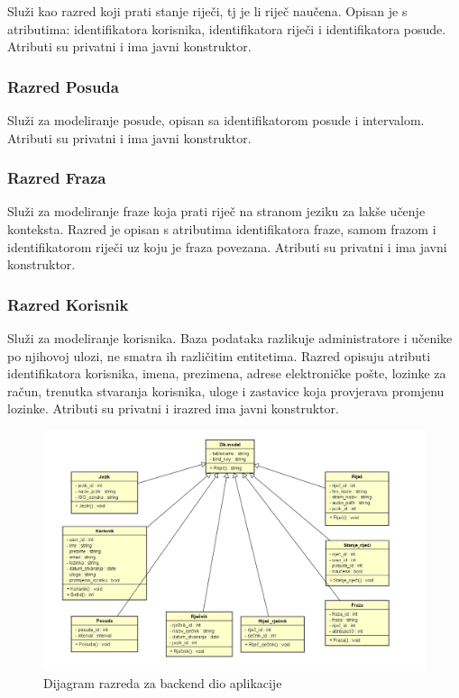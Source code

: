 Služi kao razred koji prati stanje riječi, tj je li riječ naučena. Opisan je s atributima: identifikatora korisnika, identifikatora riječi i identifikatora posude. Atributi su privatni i ima javni konstruktor.

\subsubsection{Razred Posuda}

Služi za modeliranje posude, opisan sa identifikatorom posude i intervalom.
Atributi su privatni i ima javni konstruktor.

\subsubsection{Razred Fraza}

Služi za modeliranje fraze koja prati riječ na stranom jeziku za lakše
učenje konteksta. Razred je opisan s atributima identifikatora fraze, samom frazom i identifikatorom riječi uz koju je fraza povezana. Atributi su privatni i ima javni konstruktor.


\subsubsection{Razred Korisnik}

Služi za modeliranje korisnika. Baza podataka razlikuje administratore i učenike po njihovoj ulozi,
ne smatra ih različitim entitetima. Razred opisuju atributi identifikatora korisnika, imena, prezimena,
adrese elektroničke pošte, lozinke za račun, trenutka stvaranja korisnika, uloge i zastavice
koja provjerava promjenu lozinke. Atributi su privatni i irazred ima javni konstruktor.

\begin{figure}[H]
	\includegraphics[scale=0.35]{dijagrami/class_back.jpeg}
	\centering
	\caption{Dijagram razreda za backend dio aplikacije}
	\label{fig:class-back}
\end{figure}

